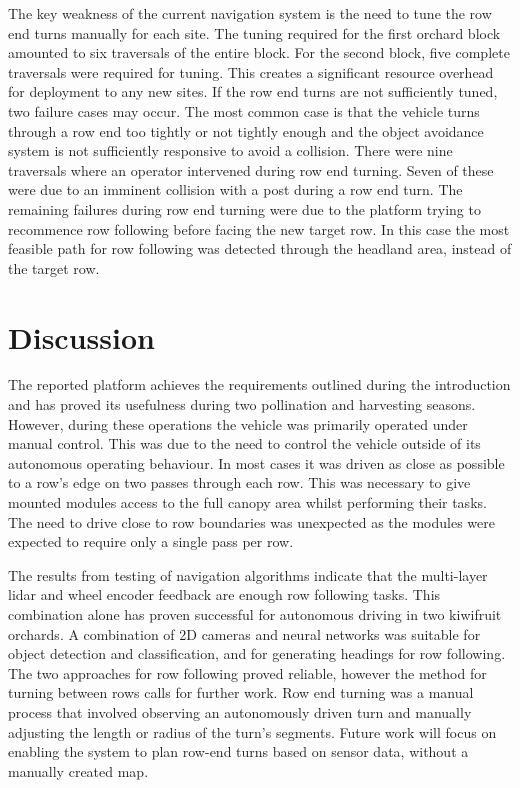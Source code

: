 \documentclass[preprint,authoryear,12pt]{elsarticle}
\begin{document}
    The key weakness of the current navigation system is the need to tune the row end turns manually for each site.
    The tuning required for the first orchard block amounted to six traversals of the entire block.
    For the second block, five complete traversals were required for tuning.
    This creates a significant resource overhead for deployment to any new sites.
    If the row end turns are not sufficiently tuned, two failure cases may occur.
    The most common case is that the vehicle turns through a row end too tightly or not tightly enough and the object avoidance system is not sufficiently responsive to avoid a collision.
    There were nine traversals where an operator intervened during row end turning.
    Seven of these were due to an imminent collision with a post during a row end turn.
    The remaining failures during row end turning were due to the platform trying to recommence row following before facing the new target row.
    In this case the most feasible path for row following was detected through the headland area, instead of the target row.



\section{Discussion}
\label{sect:discussion}

    The reported platform achieves the requirements outlined during the introduction and has proved its usefulness during two pollination and harvesting seasons.
    However, during these operations the vehicle was primarily operated under manual control.
    This was due to the need to control the vehicle outside of its autonomous operating behaviour.
    In most cases it was driven as close as possible to a row's edge on two passes through each row.
    This was necessary to give mounted modules access to the full canopy area whilst performing their tasks.
    The need to drive close to row boundaries was unexpected as the modules were expected to require only a single pass per row.

    The results from testing of navigation algorithms indicate that the multi-layer lidar and wheel encoder feedback are enough row following tasks.
    This combination alone has proven successful for autonomous driving in two kiwifruit orchards.
    A combination of 2D cameras and neural networks was suitable for object detection and classification, and for generating headings for row following.
    The two approaches for row following proved reliable, however the method for turning between rows calls for further work.
    Row end turning was a manual process that involved observing an autonomously driven turn and manually adjusting the length or radius of the turn's segments.
    Future work will focus on enabling the system to plan row-end turns based on sensor data, without a manually created map.
\end{document}
